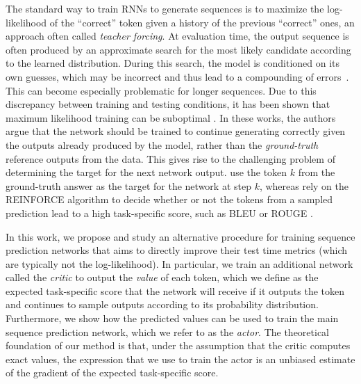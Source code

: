 \documentclass{article} %
\begin{document}
The standard way to train RNNs to generate sequences is to
maximize the log-likelihood of the ``correct'' token given a history of the
previous ``correct'' ones, an approach often called \textit{teacher forcing}.
At evaluation time, the output sequence is often produced by an approximate search for 
the most likely candidate according to the learned distribution. During this search,
the model is conditioned on its own guesses, which may be incorrect and thus lead to a compounding of errors~\citep{bengio2015scheduled}.
This can become especially problematic for longer sequences.
Due to this discrepancy between training and testing conditions, it has been shown that maximum likelihood training can be suboptimal \citep{bengio2015scheduled,ranzato2015sequence}. 
In these works, the authors argue that the network should be trained to continue
generating correctly given the outputs already produced by the model, rather
than the \emph{ground-truth} reference outputs from the data. This gives rise to the challenging problem of
determining the target for the next network output.
\citet{bengio2015scheduled} use the
token $k$ from the ground-truth answer as the target for the network at step
$k$, whereas \citet{ranzato2015sequence} rely on the REINFORCE
algorithm \citep{williams1992simple} to decide whether or not the tokens from a
sampled prediction lead to a high task-specific score, such as BLEU 
\citep{papineni2002bleu} or ROUGE \citep{lin2003automatic}.

In this work, we propose and study an alternative procedure for training
sequence prediction networks that aims to directly improve their test time
metrics (which are typically not the log-likelihood).
In particular, we train an additional network called 
the \textit{critic} to output the \textit{value} of each
token, which we define as the expected task-specific score that the network
will receive if it outputs the token and continues to sample outputs according to
its probability distribution. Furthermore, we show how the predicted values can be used
to train the main sequence prediction network, which we refer to as the \textit{actor}.
The theoretical foundation of our method is that, under the assumption that the
critic computes exact values, the expression that we use to train the actor is an unbiased
estimate of the gradient of the expected task-specific score. 
\end{document}
